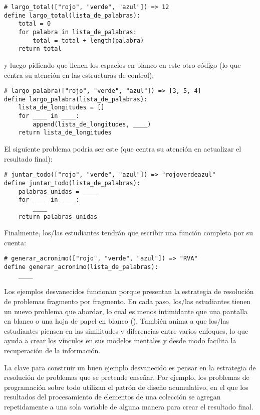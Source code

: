 \begin{verbatim}
# largo_total(["rojo", "verde", "azul"]) => 12
define largo_total(lista_de_palabras):
    total = 0
    for palabra in lista_de_palabras:
        total = total + length(palabra)
    return total
\end{verbatim}

\noindent

y luego pidiendo que llenen los espacios en blanco en este otro código
(lo que centra su atención en las estructuras de control):


\begin{verbatim}
# largo_palabra(["rojo", "verde", "azul"]) => [3, 5, 4]
define largo_palabra(lista_de_palabras):
    lista_de_longitudes = []
    for ____ in ____:
        append(lista_de_longitudes, ____)
    return lista_de_longitudes
\end{verbatim}

El siguiente problema podría ser este
(que centra su atención en actualizar el resultado final):

\begin{verbatim}
# juntar_todo(["rojo", "verde", "azul"]) => "rojoverdeazul"
define juntar_todo(lista_de_palabras):
    palabras_unidas = ____
    for ____ in ____:
        ____
    return palabras_unidas
\end{verbatim}

Finalmente, los/las estudiantes tendrán que escribir una función completa por su cuenta:

\begin{verbatim}
# generar_acronimo(["rojo", "verde", "azul"]) => "RVA"
define generar_acronimo(lista_de_palabras):
    ____
\end{verbatim}

Los ejemplos desvanecidos funcionan porque
presentan la estrategia de resolución de problemas fragmento por fragmento.
En cada paso,
los/las estudiantes tienen un nuevo problema que abordar,
lo cual es menos intimidante que una pantalla en blanco o una hoja de papel en blanco ().
También anima a que los/las estudiantes piensen en las similitudes y diferencias entre varios enfoques,
lo que ayuda a crear los vínculos en sus modelos mentales y desde modo facilita la recuperación de la información.

La clave para construir un buen ejemplo desvanecido es
pensar en la estrategia de resolución de problemas que se pretende enseñar.
Por ejemplo,
los problemas de programación sobre todo utilizan el patrón de diseño acumulativo,
en el que los resultados del procesamiento de elementos de una colección
se agregan repetidamente a una sola variable de alguna manera para crear el resultado final.


